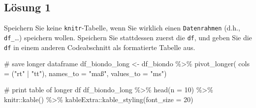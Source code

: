\documentclass[
  letterpaper,
  DIV=11]{scrartcl}
\newenvironment{Shaded}{\begin{snugshade}}{\end{snugshade}}
\newcommand{\AttributeTok}[1]{\textcolor[rgb]{0.40,0.45,0.13}{#1}}
\newcommand{\CommentTok}[1]{\textcolor[rgb]{0.37,0.37,0.37}{#1}}
\newcommand{\DecValTok}[1]{\textcolor[rgb]{0.68,0.00,0.00}{#1}}
\newcommand{\FunctionTok}[1]{\textcolor[rgb]{0.28,0.35,0.67}{#1}}
\newcommand{\NormalTok}[1]{\textcolor[rgb]{0.00,0.23,0.31}{#1}}
\newcommand{\OtherTok}[1]{\textcolor[rgb]{0.00,0.23,0.31}{#1}}
\newcommand{\SpecialCharTok}[1]{\textcolor[rgb]{0.37,0.37,0.37}{#1}}
\newcommand{\StringTok}[1]{\textcolor[rgb]{0.13,0.47,0.30}{#1}}
\begin{document}
\subsection{Lösung 1}

Speichern Sie keine \texttt{knitr}-Tabelle, wenn Sie wirklich einen
\texttt{Datenrahmen} (d.h., \texttt{df\_}\ldots) speichern wollen.
Speichern Sie stattdessen zuerst die \texttt{df}, und geben Sie die
\texttt{df} in einem anderen Codeabschnitt als formatierte Tabelle aus.

\begin{Shaded}
\begin{Highlighting}[numbers=left,,]
\CommentTok{\# save longer dataframe}
\NormalTok{df\_biondo\_long }\OtherTok{\textless{}{-}}\NormalTok{ df\_biondo }\SpecialCharTok{\%\textgreater{}\%} 
  \FunctionTok{pivot\_longer}\NormalTok{(}
    \AttributeTok{cols =}\NormalTok{ (}\StringTok{"rt"} \SpecialCharTok{|} \StringTok{"tt"}\NormalTok{),}
    \AttributeTok{names\_to =} \StringTok{"maß"}\NormalTok{,}
    \AttributeTok{values\_to =} \StringTok{"ms"}\NormalTok{)}
\end{Highlighting}
\end{Shaded}

\begin{Shaded}
\begin{Highlighting}[numbers=left,,]
\CommentTok{\# print table of longer df}
\NormalTok{df\_biondo\_long }\SpecialCharTok{\%\textgreater{}\%} 
  \FunctionTok{head}\NormalTok{(}\AttributeTok{n =} \DecValTok{10}\NormalTok{) }\SpecialCharTok{\%\textgreater{}\%} 
\NormalTok{  knitr}\SpecialCharTok{::}\FunctionTok{kable}\NormalTok{() }\SpecialCharTok{\%\textgreater{}\%} 
\NormalTok{  kableExtra}\SpecialCharTok{::}\FunctionTok{kable\_styling}\NormalTok{(}\AttributeTok{font\_size =} \DecValTok{20}\NormalTok{)}
\end{Highlighting}
\end{Shaded}
\end{document}
